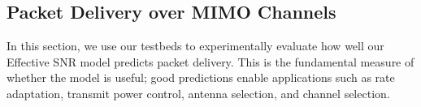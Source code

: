 \subsection{Packet Delivery over MIMO Channels}
In this section, we use our testbeds to experimentally evaluate how well our Effective SNR model predicts packet delivery. This is the fundamental measure of whether the model is useful; good predictions enable applications such as rate adaptation, transmit power control, antenna selection, and channel selection.

\begin{figure}[ht]
	\centering
	\hspace{0.14\columnwidth}%
	

\end{figure}
